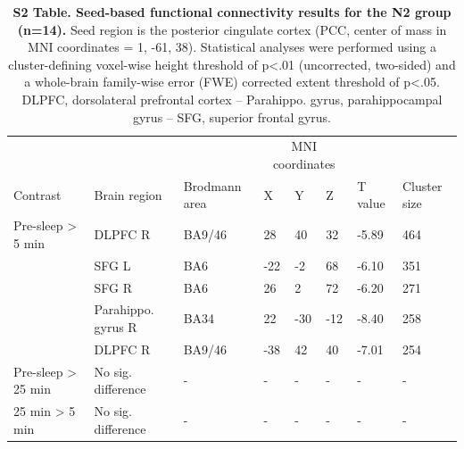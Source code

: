 \begin{table}[htb]
    \caption*{\textbf{S2 Table. Seed-based functional connectivity results for the N2 group (n=14).} Seed region is the posterior cingulate cortex (PCC, center of mass in MNI coordinates = 1, -61, 38). Statistical analyses were performed using a cluster-defining voxel-wise height threshold of p<.01 (uncorrected, two-sided) and a whole-brain family-wise error (FWE) corrected extent threshold of p<.05. DLPFC, dorsolateral prefrontal cortex – Parahippo. gyrus, parahippocampal gyrus – SFG, superior frontal gyrus.}
    \begin{tabularx}{\textwidth}{XXXllllX}
    \toprule
    &                       &                       & \multicolumn{3}{c}{MNI coordinates}                &              &               \\
    Contrast                & Brain region          & Brodmann area & X          & Y         & Z         & T value 		& Cluster size  \\ \midrule
    Pre-sleep > 5 min       & DLPFC R               & BA9/46        & 28         & 40        & 32        & -5.89        & 464           \\
                            & SFG L                 & BA6           & -22        & -2        & 68        & -6.10        & 351           \\
                            & SFG R                 & BA6           & 26         & 2         & 72        & -6.20        & 271           \\
                            & Parahippo. gyrus R    & BA34          & 22         & -30       & -12       & -8.40        & 258           \\
                            & DLPFC R               & BA9/46        & -38        & 42        & 40        & -7.01        & 254           \\
    Pre-sleep > 25 min      & No sig. difference    & -             & -          & -         & -         & -            & -             \\
    25 min > 5 min          & No sig. difference    & -             & -          & -         & -         & -            & -             \\ \bottomrule
    \end{tabularx}%
\end{table}

